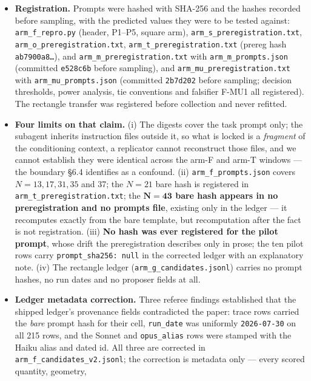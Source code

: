 \documentclass[11pt]{article}
\begin{document}
\begin{itemize}
\item \textbf{Registration.} Prompts were hashed with SHA-256 and the hashes recorded before sampling,
  with the predicted values they were to be tested against: \texttt{arm\_f\_repro.py} (header, P1--P5,
  square arm), \texttt{arm\_s\_preregistration.txt}, \texttt{arm\_o\_preregistration.txt},
  \texttt{arm\_t\_preregistration.txt} (prereg hash \texttt{ab7900a8\dots}), and
  \texttt{arm\_m\_preregistration.txt} with \texttt{arm\_m\_prompts.json} (committed
  \texttt{e528c6b} before sampling), and \texttt{arm\_mu\_preregistration.txt} with
  \texttt{arm\_mu\_prompts.json} (committed \texttt{2b7d202} before sampling; decision
  thresholds, power analysis, tie conventions and falsifier F-MU1 all registered). The
  rectangle transfer was registered before collection and never refitted.
\item \textbf{Four limits on that claim.} (i) The digests cover the task prompt only; the subagent
  inherits instruction files outside it, so what is locked is a \textit{fragment} of the conditioning
  context, a replicator cannot reconstruct those files, and we cannot establish they were
  identical across the arm-F and arm-T windows --- the boundary \S6.4 identifies as a confound.
  (ii) \texttt{arm\_f\_prompts.json} covers $N = 13, 17, 31, 35$ and 37; the $N = 21$ bare hash is registered
  in \texttt{arm\_t\_preregistration.txt}; the \textbf{$\boldsymbol{N = 43}$ bare hash appears in no preregistration and no
  prompts file}, existing only in the ledger --- it recomputes exactly from the bare template, but
  recomputation after the fact is not registration. (iii) \textbf{No hash was ever registered for the
  pilot prompt}, whose drift the preregistration describes only in prose; the ten pilot rows
  carry \texttt{prompt\_sha256: null} in the corrected ledger with an explanatory note. (iv) The
  rectangle ledger (\texttt{arm\_g\_candidates.jsonl}) carries no prompt hashes, no run dates and no
  proposer fields at all.
\item \textbf{Ledger metadata correction.} Three referee findings established that the shipped ledger's
  provenance fields contradicted the paper: trace rows carried the \textit{bare} prompt hash for their
  cell, \texttt{run\_date} was uniformly \texttt{2026-07-30} on all 215 rows, and the Sonnet and \texttt{opus\_alias}
  rows were stamped with the Haiku alias and dated id. All three are corrected in
  \texttt{arm\_f\_candidates\_v2.jsonl}; the correction is metadata only --- every scored quantity, geometry,

\end{itemize}
\end{document}
